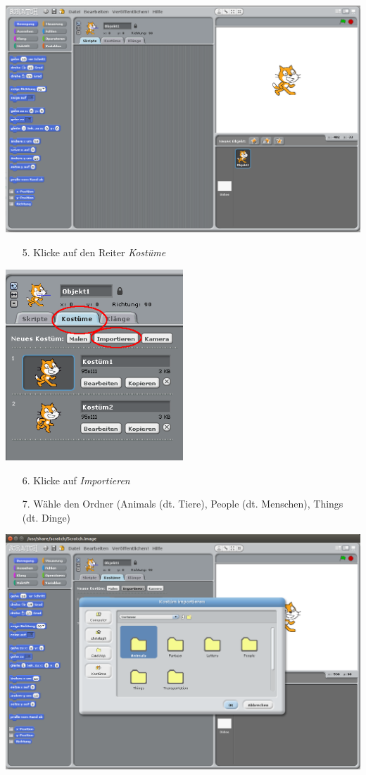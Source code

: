 \includegraphics[width=\textwidth]{images/aufgabe1_start.png}

\begin{itemize}
\item[5.] Klicke auf den Reiter \textit{Kostüme}
\end{itemize}

\includegraphics[width=0.5\textwidth]{images/aufgabe1_kostueme.png}

\begin{itemize}
\item[6.] Klicke auf \textit{Importieren}
\item[7.] Wähle den Ordner (Animals (dt. Tiere), People (dt. Menschen), Things (dt. Dinge)
\end{itemize}

\includegraphics[width=\textwidth]{images/aufgabe1_ordner.png}

